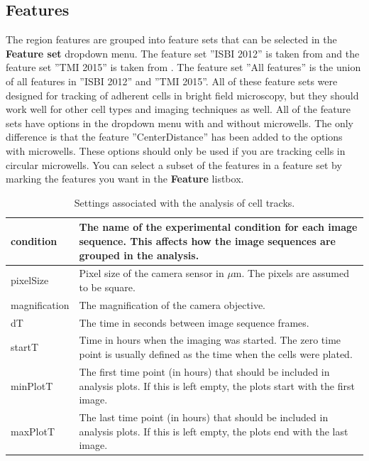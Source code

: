 \documentclass[a4paper, oneside, onecolumn, 11pt]{article}
\newcommand{\control}[1]{\textbf{#1}}
\begin{document}
\subsection{Features}
The region features are grouped into feature sets that can be selected in the \control{Feature set} dropdown menu. The feature set ''ISBI 2012'' is taken from \cite{Magnusson12Viterbi} and the feature set ''TMI 2015'' is taken from \cite{Magnusson15Viterbi}. The feature set ''All features'' is the union of all features in ''ISBI 2012'' and ''TMI 2015''. All of these feature sets were designed for tracking of adherent cells in bright field microscopy, but they should work well for other cell types and imaging techniques as well. All of the feature sets have options in the dropdown menu with and without microwells. The only difference is that the feature ''CenterDistance'' has been added to the options with microwells. These options should only be used if you are tracking cells in circular microwells. You can select a subset of the features in a feature set by marking the features you want in the \control{Feature} listbox.

\begin{table}[!htb]
\caption{Settings associated with the analysis of cell tracks.}
\label{tab:analysis-settings}
\begin{tabularx}{\textwidth}{lX}
\hline
condition & The name of the experimental condition for each image sequence. This affects how the image sequences are grouped in the analysis. \\[5pt] \hline

pixelSize & Pixel size of the camera sensor in $\mu$m. The pixels are assumed to be square. \\[5pt] \hline

magnification & The magnification of the camera objective. \\[5pt] \hline

dT & The time in seconds between image sequence frames. \\[5pt] \hline

startT & Time in hours when the imaging was started. The zero time point is usually defined as the time when the cells were plated. \\[5pt] \hline

minPlotT & The first time point (in hours) that should be included in analysis plots. If this is left empty, the plots start with the first image. \\[5pt] \hline

maxPlotT & The last time point (in hours) that should be included in analysis plots. If this is left empty, the plots end  with the last image. \\[5pt] \hline
\end{tabularx}
\end{table}
\end{document}
